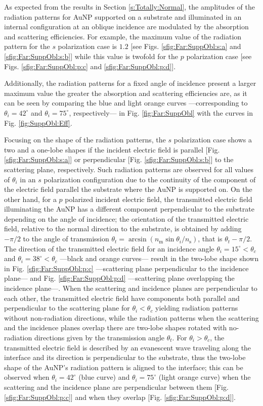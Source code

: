 As expected from the results in Section \ref{s:Totally:Normal}, the amplitudes of the radiation patterns for AuNP supported on a substrate and illuminated in an internal configuration at an oblique incidence are modulated by the absorption and scattering efficiencies. For example, the maximum value of the radiation pattern for the $s$ polarization case is $1.2$ [see Figs. \ref{sfig:Far:SuppObl:s:a} and \ref{sfig:Far:SuppObl:s:b}] while this value is twofold for the $p$ polarization case [see Figs. \ref{sfig:Far:SuppObl:p:c} and \ref{sfig:Far:SuppObl:p:d}]. {Additionally, the radiation patterns for a fixed angle of incidence present a larger maximum value the greater the absorption and scattering efficiencies are, as it can be seen by comparing the blue and light orange curves ---corresponding to $\theta_i = 42^\circ$ and $\theta_i = 75^\circ$, respectively--- in Fig. \ref{fig:Far:SuppObl} with the curves in Fig. \ref{fig:SuppObl:Eff}.

Focusing on the shape of the radiation patterns, the $s$ polarization case shows a two and a one-lobe shapes if the incident electric field is parallel [Fig. \ref{sfig:Far:SuppObl:s:a}] or perpendicular [Fig. \ref{sfig:Far:SuppObl:s:b}] to the scattering plane, respectively. Such radiation patterns are observed for all values of $\theta_i$ in an $s$ polarization configuration due to the continuity of the component of the electric field parallel the substrate where the AuNP is supported on. On the other hand, for a $p$ polarized incident electric field, the transmitted electric field illuminating the AuNP has a different component perpendicular to the substrate depending on the angle of incidence; the orientation of the transmitted electric field, relative to the normal direction to the substrate, is obtained by adding $-\pi/2$ to the angle of transmission $\theta_t = \arcsin(n_\text{m}\sin\theta_i/n_\text{s})$, that is $\theta_t - \pi/2$. The direction of the transmitted electric field for an incidence angle $\theta_i = 15^\circ<\theta_c$ and $\theta_i = 38^\circ<\theta_c$ ---black and orange curves--- result in the two-lobe shape shown in Fig. \ref{sfig:Far:SuppObl:p:c} ---scattering plane perpendicular to the incidence plane--- and Fig. \ref{sfig:Far:SuppObl:p:d} ---scattering plane overlapping the incidence plane---. When the scattering and incidence planes are perpendicular to each other, the transmitted electric field have components both parallel and perpendicular to the scattering plane for $\theta_i<\theta_c$ yielding radiation patterns without non-radiation directions, while the radiation patterns when the scattering and the incidence planes overlap there are two-lobe shapes rotated with no-radiation directions given by the transmission angle $\theta_t$. For $\theta_i>\theta_c$, the transmitted electric field is described by an evanescent wave traveling along the interface and its direction is perpendicular to the substrate, thus the two-lobe shape of the AuNP's radiation pattern is aligned to the interface; this can be observed when $\theta_i = 42^\circ$ (blue curve) and $\theta_i = 75^\circ$ (light orange curve) when the scattering and the incidence plane are perpendicular between them [Fig. \ref{sfig:Far:SuppObl:p:c}] and when they overlap [Fig. \ref{sfig:Far:SuppObl:p:d}].

}
